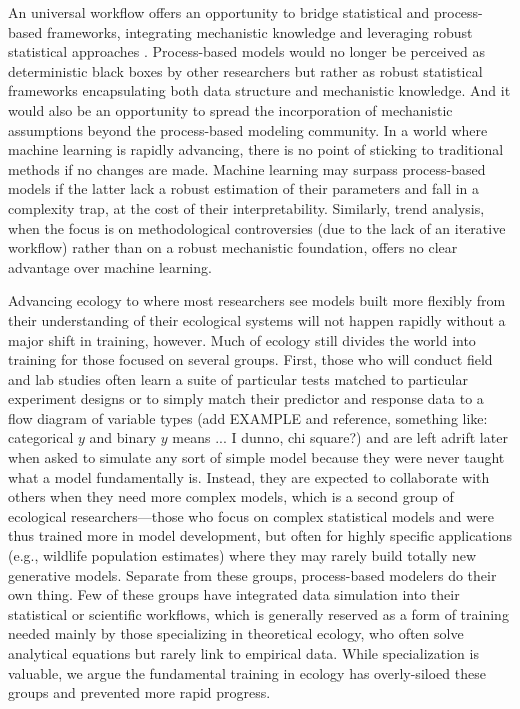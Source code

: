 \documentclass[11pt]{article}
\begin{document}
An universal workflow offers an opportunity to bridge statistical and process-based frameworks, integrating mechanistic knowledge and leveraging robust statistical approaches \citep[e.g.][]{rounce2020quantifying}. Process-based models would no longer be perceived as deterministic black boxes by other researchers but rather as robust statistical frameworks encapsulating both data structure and mechanistic knowledge. And it would also be an opportunity to spread the incorporation of mechanistic assumptions beyond the process-based modeling community.
In a world where machine learning is rapidly advancing, there is no point of sticking to traditional methods if no changes are made. Machine learning may surpass process-based models if the latter lack a robust estimation of their parameters and fall in a complexity trap, at the cost of their interpretability. Similarly, trend analysis, when the focus is on methodological controversies (due to the lack of an iterative workflow) rather than on a robust mechanistic foundation, offers no clear advantage over machine learning.

Advancing ecology to where most researchers see models built more flexibly from their understanding of their ecological systems will not happen rapidly without a major shift in training, however. Much of ecology still divides the world into training for those focused on several groups. First, those who will conduct field and lab studies often learn a suite of particular tests matched to particular experiment designs or to simply match their predictor and response data to a flow diagram of variable types (add EXAMPLE and reference, something like: categorical $y$ and binary $y$ means ... I dunno, chi square?) and are left adrift later when asked to simulate any sort of simple model because they were never taught what a model fundamentally is. Instead, they are expected to collaborate with others when they need more complex models, which is a second group of ecological researchers---those who focus on complex statistical models and were thus trained more in model development, but often for highly specific applications (e.g., wildlife population estimates) where they may rarely build totally new generative models. Separate from these groups, process-based modelers do their own thing. 
%
Few of these groups have integrated data simulation into their statistical or scientific workflows, which is generally reserved as a form of training needed mainly by those specializing in theoretical ecology, who often solve analytical equations but rarely link to empirical data. While specialization is valuable, we argue the fundamental training in ecology has overly-siloed these groups and prevented more rapid progress.
\end{document}
